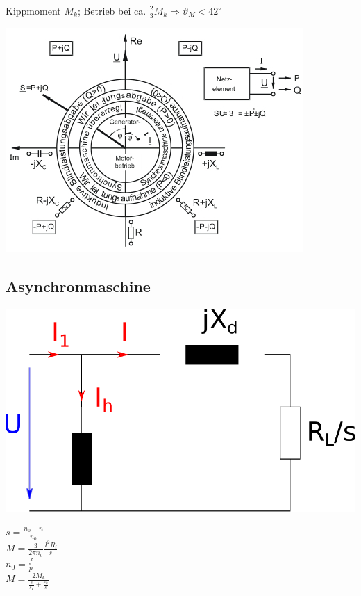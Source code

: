 \documentclass[fs, footer]{latex4ei}
\begin{document}
\begin{multicols}{4}
    Kippmoment $M_k$; Betrieb bei ca. $\frac{2}{3} M_k \Rightarrow \vartheta_M < 42^\circ$\\

    \begin{center}
        \includegraphics[scale=.6]{./img/synchronmaschine_betriebsbereiche.jpg}
    \end{center}

    \subsection{Asynchronmaschine}

    \begin{center}
        \includegraphics[scale=.2]{./img/ersatzschaltbild_asynchronmaschine.pdf}
    \end{center}

    $s = \frac{n_0 - n}{n_0}$ \\
    $M = \frac{3}{2 \pi n_0} \frac{I^2 R_l}{s}$ \\
    $n_0 = \frac{f}{p}$ \\
    $M = \frac{2 M_k}{\frac{s}{s_k} + \frac{s_k}{s}}$



\end{multicols}
\end{document}
